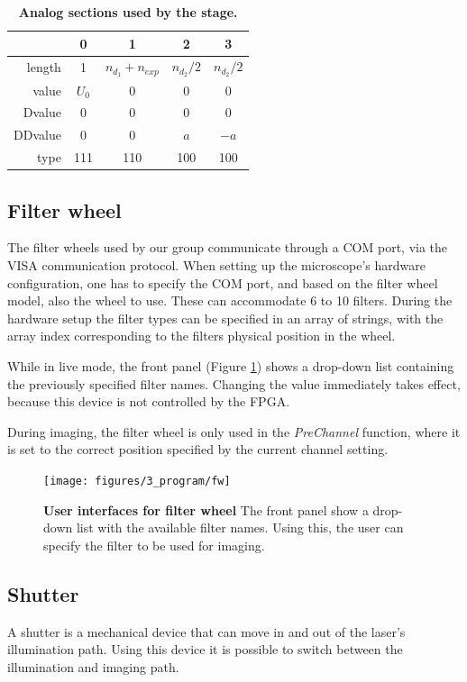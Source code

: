 \documentclass{diploma_style}
\begin{document}
\begin{table}[htbp]
\centering
\begin{tabular}{r|c||c|c|c}
			& 0 & 1 & 2 & 3\\ \hline \hline
	length  & 1 & $n_{d_1} + n_{exp}$ & $n_{d_2}/2$ & $n_{d_2}/2$ \\
	value   & $U_{0}$ & 0 & 0 & 0  \\
	Dvalue  & 0 & 0 & 0 & 0 \\
	DDvalue & 0 & 0 & $a$ & $-a$ \\
	type    & 111& 110 & 100 & 100 \\
\end{tabular}
\caption{\textbf{Analog sections used by the stage.}}
\label{tab:stage}
\end{table}



\subsection{Filter wheel}
The filter wheels used by our group communicate through a COM port, via the VISA communication protocol. When setting up the microscope's hardware configuration, one has to specify the COM port, and based on the filter wheel model, also the wheel to use. These can accommodate 6 to 10 filters. During the hardware setup the filter types can be specified in an array of strings, with the array index corresponding to the filters physical position in the wheel.

While in live mode, the front panel (Figure \ref{fig:ui_fw}) shows a drop-down list containing the previously specified filter names. Changing the value immediately takes effect, because this device is not controlled by the FPGA.

During imaging, the filter wheel is only used in the \emph{PreChannel} function, where it is set to the correct position specified by the current channel setting.

\begin{figure}[htbp]
	\centering
	\texttt{[image: figures/3\_program/fw]}
	\caption{\textbf{User interfaces for filter wheel} The front panel show a drop-down list with the available filter names. Using this, the user can specify the filter to be used for imaging.}	
	\label{fig:ui_fw}	
\end{figure}



\subsection{Shutter}
A shutter is a mechanical device that can move in and out of the laser's illumination path. Using this device it is possible to switch between the illumination and imaging path.
\end{document}
